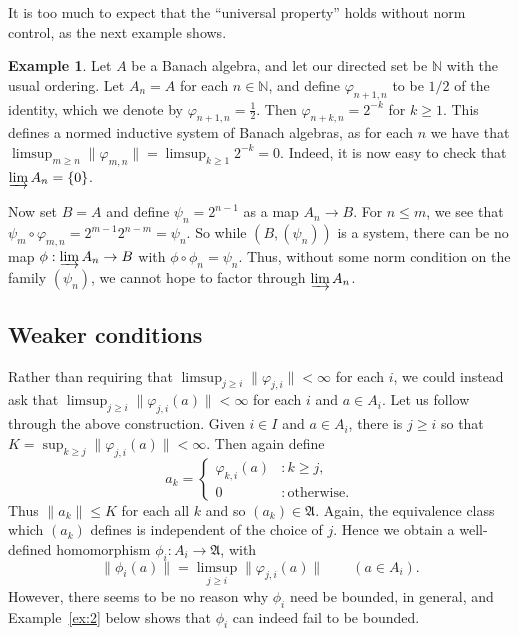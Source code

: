 \documentclass[a4paper,11pt]{article}
\newcommand{\mf}{\mathfrak}
\newcommand{\indlim}{\varinjlim}
\theoremstyle{definition}
\newtheorem{example}[lemma]{Example}
\begin{document}
It is too much to expect that the ``universal property'' holds without norm control, as the next
example shows.

\begin{example}\label{ex:one}
Let $A$ be a Banach algebra, and let our directed set be $\mathbb N$ with the usual ordering.
Let $A_n = A$ for each $n\in\mathbb N$, and define $\varphi_{n+1,n}$ to be $1/2$ of the identity,
which we denote by $\varphi_{n+1,n} = \frac12$.  Then $\varphi_{n+k,n} = 2^{-k}$ for $k\geq 1$.
This defines a normed inductive system of Banach algebras, as for each $n$ we have that
$\limsup_{m\geq n} \|\varphi_{m,n}\| = \limsup_{k\geq 1} 2^{-k} = 0$.  Indeed, it is now easy to
check that $\indlim A_n = \{0\}$.

Now set $B=A$ and define $\psi_n = 2^{n-1}$ as a map $A_n\rightarrow B$.  For $n\leq m$, we see that
$\psi_m \circ \varphi_{m,n} = 2^{m-1} 2^{n-m} = \psi_n$.  So while $(B, (\psi_n))$ is a system,
there can be no map $\phi:\indlim A_n\rightarrow B$ with $\phi\circ\phi_n = \psi_n$.  Thus, without
some norm condition on the family $(\psi_n)$, we cannot hope to factor through $\indlim A_n$.
\end{example}



\subsection{Weaker conditions}

Rather than requiring that $\limsup_{j\geq i} \|\varphi_{j,i}\| < \infty$ for each $i$, we could
instead ask that $\limsup_{j\geq i} \|\varphi_{j,i}(a)\| < \infty$ for each $i$ and $a\in A_i$.
Let us follow through the above construction.  Given $i\in I$ and
$a\in A_i$, there is $j\geq i$ so that $K=\sup_{k\geq j} \|\varphi_{j,i}(a)\| < \infty$.  Then
again define
\[ a_k = \begin{cases} \varphi_{k,i}(a) &: k\geq j, \\ 0 &:\text{otherwise}. \end{cases} \]
Thus $\|a_k\| \leq K$ for each all $k$ and so $(a_k)\in\mf A$.  Again, the equivalence class which
$(a_k)$ defines is independent of the choice of $j$.  Hence we obtain a well-defined homomorphism
$\phi_i:A_i\rightarrow\mf A$, with
\[ \|\phi_i(a)\| = \limsup_{j\geq i} \|\varphi_{j,i}(a)\| \qquad (a\in A_i). \]
However, there seems to be no reason why $\phi_i$ need be bounded, in general, and
Example~\ref{ex:2} below shows that $\phi_i$ can indeed fail to be bounded.
\end{document}
